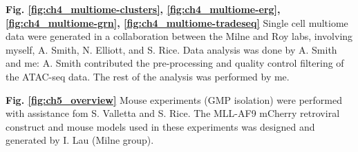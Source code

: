 \noindent
\textbf{Fig. \ref{fig:ch4_multiome-clusters}, \ref{fig:ch4_multiome-erg}, \ref{fig:ch4_multiome-grn}, \ref{fig:ch4_multiome-tradeseq}} Single cell multiome data were generated in a collaboration between the Milne and Roy labs, involving myself, A. Smith, N. Elliott, and S. Rice. Data analysis was done by A. Smith and me: A. Smith contributed the pre-processing and quality control filtering of the ATAC-seq data. The rest of the analysis was performed by me.

\noindent
\textbf{Fig. \ref{fig:ch5_overview}} Mouse experiments (GMP isolation) were performed with assistance fom S. Valletta and S. Rice. The MLL-AF9 mCherry retroviral construct and \mybmre{} mouse models used in these experiments was designed and generated by I. Lau (Milne group).

